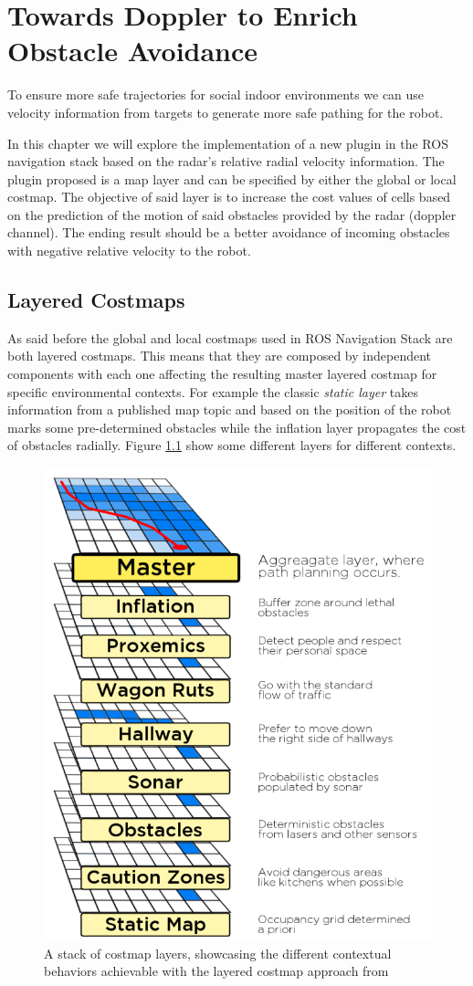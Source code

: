 \chapter{Towards Doppler to Enrich Obstacle Avoidance}
To ensure more safe trajectories for social indoor environments we can use velocity information from targets to generate more safe pathing for  the robot. 

In this chapter we will explore the implementation of a new plugin in the ROS navigation stack based on the radar's relative radial velocity information. The plugin proposed is a map layer and can be specified by either the global or local costmap. The objective of said layer is to increase the cost values of cells based on the prediction of the motion of said obstacles provided by the radar (doppler channel). The ending result should be a better avoidance of incoming obstacles with negative relative velocity  to the robot.

\section{Layered Costmaps}
As said before the global and local costmaps used in \ac{ROS} Navigation Stack are both layered costmaps.
This means that they are composed by independent components with each one affecting the resulting master layered costmap for specific environmental contexts. For example the classic \textit{static layer} takes information from a published map topic and based on the position of the robot marks some  pre-determined obstacles while the inflation layer propagates the cost of obstacles radially.  Figure \ref{fig::layers} show some different layers for different contexts.
\begin{figure}[ht!] 
\centerline{\includegraphics [width=0.5 \textwidth]{imgs/chapter6/layers.png}}
\caption[A stack of costmap layers]{A stack of costmap layers, showcasing the different contextual
behaviors achievable with the layered costmap approach from \cite{lu2014layered}}
\label{fig::layers}
\end{figure}

